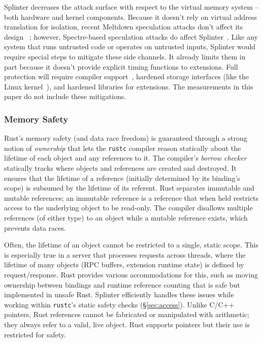 Splinter decreases the attack surface with respect to the virtual memory system --
    both hardware and kernel components.
Because it doesn't rely on virtual address translation for
    isolation,
    recent Meltdown speculation attacks don't affect its design~\cite{meltdown-2018}%
; however, Spectre-based speculation attacks do affect Splinter~\cite{sbo,spectre-2018}.
Like any system that runs untrusted code or operates on untrusted
  inputs, Splinter would require special steps to mitigate these side channels.
It already limits them in part because it doesn't provide explicit
  timing functions to extensions.
Full protection will require compiler support~\cite{llvm-spectre},
hardened storage interfaces (like
  the Linux kernel~\cite{linux-spectre}), and hardened libraries for
  extensions.
The measurements in this paper do not include these mitigations.

\subsubsection{Memory Safety}
\label{sec:safety}

Rust's memory safety (and data race freedom) is guaranteed through a strong notion
  of \textsl{ownership} that lets the \texttt{rustc} compiler reason statically
  about the lifetime of each object and any references to it.
The compiler's \textsl{borrow checker} statically tracks where objects and
  references are created and destroyed.
It ensures that the lifetime of a reference (initially determined by its binding's scope)
  is subsumed by the lifetime of its referent.
Rust separates immutable and mutable references; an immutable reference is a
  reference that when held restricts access to the underlying object to be read-only.
The compiler disallows multiple references (of either type) to
  an object while a mutable reference exists, which prevents data races.

Often, the lifetime of an object cannot be restricted to a single, static scope.
This is especially true in a server that processes requests across threads,
  where the lifetime of many objects (RPC buffers, extension runtime
  state) is defined by request/response.
Rust provides various accommodations for this, such as moving ownership between
  bindings and runtime reference counting that is safe but implemented in unsafe Rust.
Splinter efficiently handles these issues while working within
\texttt{rustc}'s static safety checks (\S\ref{sec:access}).
Unlike C/C++ pointers, Rust references cannot be fabricated or manipulated with
  arithmetic; they always refer to a valid, live object.
Rust supports pointers but their use is restricted for safety.

